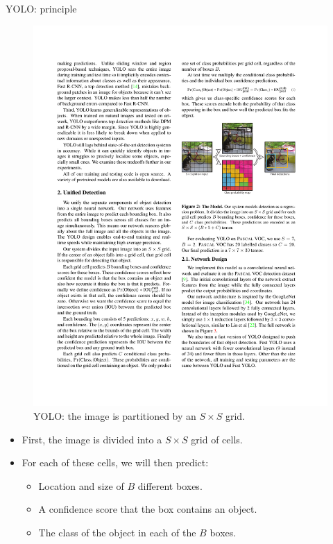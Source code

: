 \documentclass[xcolor=pdftex,dvipsnames,table]{beamer}
\begin{document}
\begin{frame}{YOLO: principle}
\begin{figure}[htb]
   \centering
   \includegraphics[height=0.4\textheight]{../graphics/YOLO_2_v2.pdf}
   \caption{YOLO: the image is partitioned by an $S \times S$ grid.}
\end{figure}
\begin{itemize}
   \item First, the image is divided into a $S \times S$ grid of cells. 
   \item For each of these cells, we will then predict:
   \begin{itemize}
      \item Location and size of $B$ different boxes. 
      \item A confidence score that the box contains an object. 
      \item The class of the object in each of the $B$ boxes. 
   \end{itemize}
\end{itemize}
\end{frame}
\end{document}
